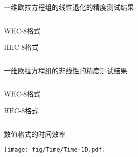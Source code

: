 \documentclass[aspectratio=169]{beamer}
\begin{document}
\begin{frame}{一维欧拉方程组的线性退化的精度测试结果}
  
  \vspace{-3mm}
  \begin{columns}
    \begin{column}{0.2\textwidth}
      
      \centering
      
      WHC-8格式
      
      \vspace{0.4\textheight}
      
      HHC-8格式
      
    \end{column}
    \begin{column}{0.8\textwidth}
      \begin{tiny}
        
      \end{tiny}
    \end{column}
  \end{columns}
  
\end{frame}

\begin{frame}{一维欧拉方程组的非线性的精度测试结果}
  
  \vspace{-3mm}
  \begin{columns}
    \begin{column}{0.2\textwidth}
      
      \centering
      
      WHC-8格式
      
      \vspace{0.4\textheight}
      
      HHC-8格式
      
    \end{column}
    \begin{column}{0.8\textwidth}
      \begin{tiny}
        
      \end{tiny}
    \end{column}
  \end{columns}
  
\end{frame}

\begin{frame}{数值格式的时间效率}
  
  \centering
  \texttt{[image: fig/Time/Time-1D.pdf]}
  
\end{frame}
\end{document}

